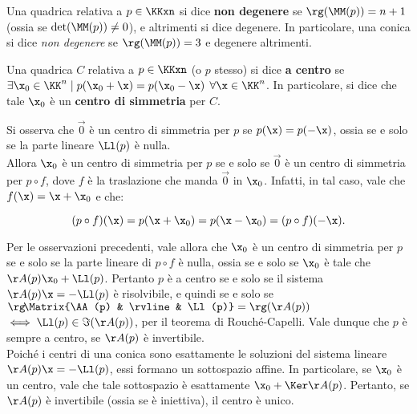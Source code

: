 \documentclass[11pt]{article}
\begin{document}
	\begin{definition} 
		Una quadrica relativa a $p \in \KKxn$ si dice \textbf{non degenere} se $\rg(\MM(p)) = n+1$ (ossia se $\det(\MM(p)) \neq 0$), e altrimenti
		si dice degenere. In particolare, una conica si dice \textit{non degenere} se $\rg(\MM(p)) = 3$ e degenere altrimenti.
	\end{definition}

	\begin{definition} 
		Una quadrica $C$ relativa a $p \in \KKxn$ (o $p$ stesso) si dice \textbf{a centro} se
		$\exists \x_0 \in \KK^n \mid p(\x_0 + \x) = p(\x_0 - \x)$ $\forall \x \in \KK^n$. In particolare, si dice che tale $\x_0$ è un \textbf{centro di simmetria} per $C$.
	\end{definition}

	\begin{remark}\nl
		\li Si osserva che $\vec 0$ è un centro di simmetria per $p$ se
		$p(\x) = p(-\x)$, ossia se e solo se la parte lineare $\Ll(p)$ è
		nulla. \\
		
		\li Allora $\x_0$ è un centro di simmetria per $p$ se e solo se $\vec 0$
		è un centro di simmetria per $p \circ f$, dove $f$ è la traslazione
		che manda $\vec 0$ in $\x_0$. Infatti, in tal caso, vale che $f(\x) = \x + \x_0$ e che:
		
		\[ (p \circ f)(\x) = p(\x + \x_0) = p(\x - \x_0) = (p \circ f)(-\x). \]
		
		\vskip 0.05in
		
		\li Per le osservazioni precedenti, vale allora che $\x_0$ è un centro
		di simmetria per $p$ se e solo se la parte lineare di $p \circ f$
		è nulla, ossia se e solo se $\x_0$ è tale che $\AA(p) \x_0 + \Ll(p)$.
		Pertanto $p$ è a centro se e solo se il sistema $\AA(p) \x = - \Ll(p)$
		è risolvibile, e quindi se e solo se $\rg\!\Matrix{\AA(p) & \rvline & \Ll(p)} = \rg(\AA(p))$ $\iff \Ll(p) \in \Im(\AA(p))$, per il teorema di Rouché-Capelli. Vale
		dunque che $p$ è sempre a centro, se $\AA(p)$ è invertibile. \\
		
		Poiché i centri di una conica sono esattamente le soluzioni del
		sistema lineare $\AA(p) \x = - \Ll(p)$, essi formano un sottospazio
		affine. In particolare, se $\x_0$ è un centro, vale che tale sottospazio
		è esattamente $\x_0 + \Ker \AA(p)$. Pertanto, se $\AA(p)$ è invertibile
		(ossia se è iniettiva), il centro è unico.
	\end{remark}
\end{document}
